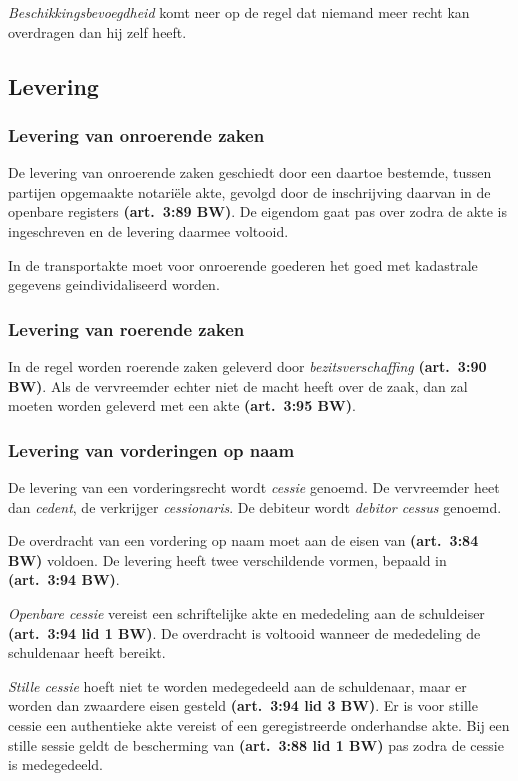 \documentclass[a4paper]{article}
\newcommand{\art}[1]{\textbf{(art.~#1 BW)}\xspace}
\begin{document}
\emph{Beschikkingsbevoegdheid} komt neer op de regel dat niemand meer recht
kan overdragen dan hij zelf heeft.

\subsection{Levering}

\subsubsection{Levering van onroerende zaken}

De levering van onroerende zaken geschiedt door een daartoe bestemde, tussen
partijen opgemaakte notari\"ele akte, gevolgd door de inschrijving daarvan in
de openbare registers \art{3:89}. De eigendom gaat pas over zodra de akte is
ingeschreven en de levering daarmee voltooid.

In de transportakte moet voor onroerende goederen het goed met kadastrale
gegevens geindividaliseerd worden.

\subsubsection{Levering van roerende zaken}

In de regel worden roerende zaken geleverd door \emph{bezitsverschaffing}
\art{3:90}. Als de vervreemder echter niet de macht heeft over de zaak, dan
zal moeten worden geleverd met een akte \art{3:95}.

\subsubsection{Levering van vorderingen op naam}

De levering van een vorderingsrecht wordt \emph{cessie} genoemd. De
vervreemder heet dan \emph{cedent}, de verkrijger \emph{cessionaris}. De
debiteur wordt \emph{debitor cessus} genoemd.

De overdracht van een vordering op naam moet aan de eisen van \art{3:84}
voldoen. De levering heeft twee verschildende vormen, bepaald in \art{3:94}.

\emph{Openbare cessie} vereist een schriftelijke akte en mededeling aan de
schuldeiser \art{3:94 lid 1}. De overdracht is voltooid wanneer de mededeling
de schuldenaar heeft bereikt.

\emph{Stille cessie} hoeft niet te worden medegedeeld aan de schuldenaar, maar
er worden dan zwaardere eisen gesteld \art{3:94 lid 3}. Er is voor stille
cessie een authentieke akte vereist of een geregistreerde onderhandse akte.
Bij een stille sessie geldt de bescherming van \art{3:88 lid 1} pas zodra de
cessie is medegedeeld.
\end{document}
